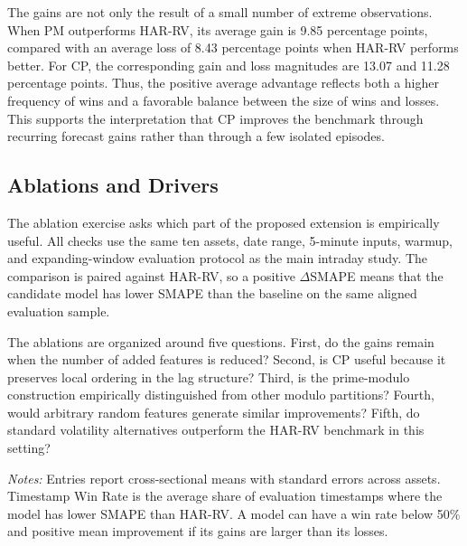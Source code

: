 ﻿\documentclass[11pt,a4paper]{article}
\begin{document}
\noindent
The gains are not only the result of a small number of extreme observations. When PM outperforms HAR-RV, its average gain is 9.85 percentage points, compared with an average loss of 8.43 percentage points when HAR-RV performs better. For CP, the corresponding gain and loss magnitudes are 13.07 and 11.28 percentage points. Thus, the positive average advantage reflects both a higher frequency of wins and a favorable balance between the size of wins and losses. This supports the interpretation that CP improves the benchmark through recurring forecast gains rather than through a few isolated episodes.

\subsection{Ablations and Drivers}

\noindent
The ablation exercise asks which part of the proposed extension is empirically useful. All checks use the same ten assets, date range, 5-minute inputs, warmup, and expanding-window evaluation protocol as the main intraday study. The comparison is paired against HAR-RV, so a positive $\Delta$SMAPE means that the candidate model has lower SMAPE than the baseline on the same aligned evaluation sample.

\noindent
The ablations are organized around five questions. First, do the gains remain when the number of added features is reduced? Second, is CP useful because it preserves local ordering in the lag structure? Third, is the prime-modulo construction empirically distinguished from other modulo partitions? Fourth, would arbitrary random features generate similar improvements? Fifth, do standard volatility alternatives outperform the HAR-RV benchmark in this setting?

{\renewcommand{\thetable}{3}
\begin{center}
\label{tab:param_efficiency}
\small
\renewcommand{\arraystretch}{1.12}
\setlength{\tabcolsep}{5pt}
\resizebox{0.98\textwidth}{!}{}

\vspace{0.1cm}
\footnotesize \parbox{0.92\textwidth}{\textit{Notes:} Entries report cross-sectional means with standard errors across assets. Timestamp Win Rate is the average share of evaluation timestamps where the model has lower SMAPE than HAR-RV. A model can have a win rate below 50\% and positive mean improvement if its gains are larger than its losses.}
\end{center}}
\end{document}
